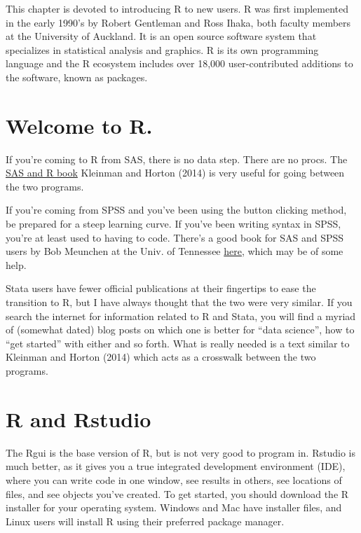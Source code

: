 \documentclass[
  letterpaper,
  DIV=11,
  numbers=noendperiod]{scrreprt}
\begin{document}
This chapter is devoted to introducing R to new users. R was first
implemented in the early 1990's by Robert Gentleman and Ross Ihaka, both
faculty members at the University of Auckland. It is an open source
software system that specializes in statistical analysis and graphics. R
is its own programming language and the R ecosystem includes over 18,000
user-contributed additions to the software, known as packages.

\hypertarget{welcome-to-r.}{%
\section{Welcome to R.}\label{welcome-to-r.}}

If you're coming to R from SAS, there is no data step. There are no
procs. The
\href{https://www.amazon.com/gp/product/1466584491/ref=as_li_tl?ie=UTF8\&camp=1789\&creative=390957\&creativeASIN=1466584491\&linkCode=as2\&tag=sasandrblog-20}{SAS
and R book} Kleinman and Horton (2014) is very useful for going between
the two programs.

If you're coming from SPSS and you've been using the button clicking
method, be prepared for a steep learning curve. If you've been writing
syntax in SPSS, you're at least used to having to code. There's a good
book for SAS and SPSS users by Bob Meunchen at the Univ. of Tennessee
\href{https://www.amazon.com/SAS-SPSS-Users-Statistics-Computing/dp/1461406846}{here},
which may be of some help.

Stata users have fewer official publications at their fingertips to ease
the transition to R, but I have always thought that the two were very
similar. If you search the internet for information related to R and
Stata, you will find a myriad of (somewhat dated) blog posts on which
one is better for ``data science'', how to ``get started'' with either
and so forth. What is really needed is a text similar to Kleinman and
Horton (2014) which acts as a crosswalk between the two programs.

\hypertarget{r-and-rstudio}{%
\section{R and Rstudio}\label{r-and-rstudio}}

The Rgui is the base version of R, but is not very good to program in.
Rstudio is much better, as it gives you a true integrated development
environment (IDE), where you can write code in one window, see results
in others, see locations of files, and see objects you've created. To
get started, you should download the R installer for your operating
system. Windows and Mac have installer files, and Linux users will
install R using their preferred package manager.
\end{document}
